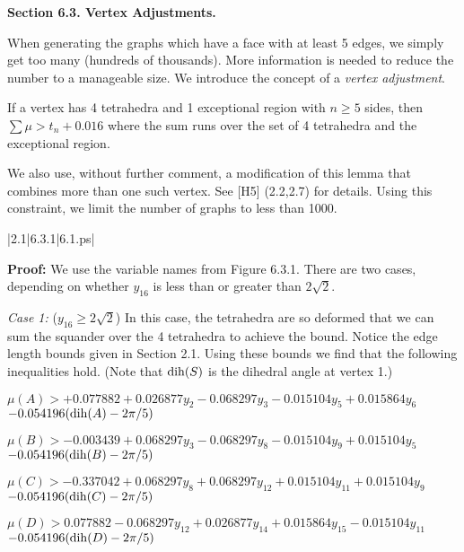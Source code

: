 \bigskip

{\bf Section 6.3. Vertex Adjustments.}

\bigskip


When generating the graphs which have a face with at least 5 edges, we simply get too many (hundreds of thousands).  More information is needed to reduce the number to a manageable size.  We introduce the concept of a {\it vertex adjustment}.  

 If a vertex has 4 tetrahedra and 1 exceptional region with $n\ge5$ sides, then $\sum\mu > t_n+0.016$ where the sum runs over the set of 4 tetrahedra and the exceptional region.
\endproclaim

We also use, without further comment, a modification of this lemma that 
combines more than one such vertex.  See [H5] (2.2,2.7) for details.
Using this constraint, we limit the number of graphs to less than 1000.  

\gram|2.1|6.3.1|6.1.ps|  %


{\bf Proof:} We use the variable names from Figure 6.3.1. 
There are two cases, depending on whether $y_{16}$ is less than or greater than $2\sqrt 2$.

{\it Case 1:} ($y_{16}\ge2\sqrt2$) In this case, the tetrahedra are so deformed that we can sum the squander over the 4 tetrahedra to achieve the bound.  
Notice the edge length bounds given in Section 2.1.  Using these bounds we find that the following inequalities hold.  (Note that $\operatorname{dih}(S)$ is the dihedral angle at vertex 1.)



$\mu(A) > + 0.077882  + 0.026877 y_2 - 0.068297 y_3 - 0.015104 y_5 + 0.015864 y_6$  \newline $- 0.054196 (\operatorname{dih}(A)-2 \pi /5) $

$\mu(B) > - 0.003439  + 0.068297 y_3 - 0.068297 y_8 - 0.015104 y_9 + 0.015104 y_5$  \newline $- 0.054196 (\operatorname{dih}(B)-2 \pi /5) $

$\mu(C) > - 0.337042   + 0.068297 y_8 + 0.068297 y_{12} + 0.015104 y_{11} + 0.015104 y_9$  \newline $- 0.054196 (\operatorname{dih}(C)-2 \pi /5) $

$\mu(D) > 0.077882 - 0.068297 y_{12} + 0.026877 y_{14} + 0.015864 y_{15} - 0.015104 y_{11}$ \newline $ - 0.054196 (\operatorname{dih}(D)-2 \pi /5)$

